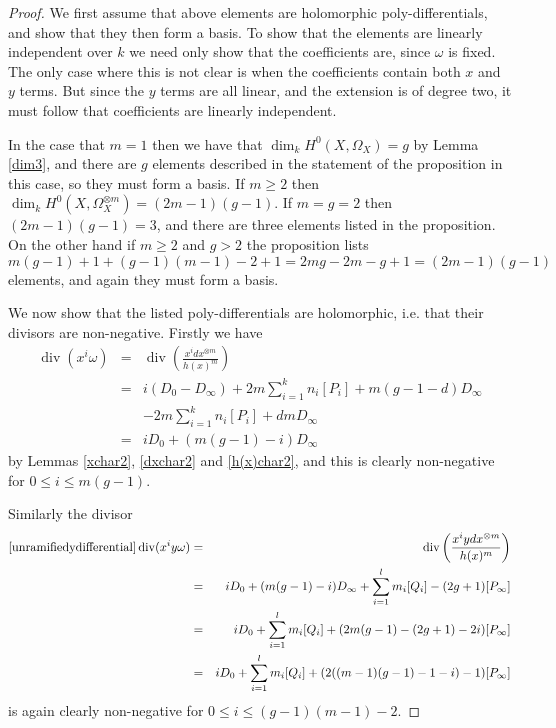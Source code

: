 \documentclass[11pt]{article} %
\theoremstyle{plain}
\theoremstyle{remark}
\DeclareMathOperator{\di}{div}
\begin{document}
\begin{proof}
 We first assume that above elements are holomorphic poly-differentials, and show that they then form a basis.
To show that the elements are linearly independent over $k$ we need only show that the coefficients are, since $\omega$ is fixed.
The only case where this is not clear is when the coefficients contain both $x$ and $y$ terms.
But since the $y$ terms are all linear, and the extension is of degree two, it must follow that coefficients are linearly independent.
 
 
 In the case that $m=1$ then we have that $\dim_k H^0(X,\Omega_X) =g$ by Lemma \ref{dim3}, and there are $g$ elements described in the statement of the proposition in this case, so they must form a basis.
 If $m \geq 2$ then $\dim_k H^0(X,\Omega_X^{\otimes m}) = (2m-1)(g-1)$.
 If $m=g=2$ then $(2m-1)(g-1) = 3$, and there are three elements listed in the proposition.
 On the other hand if $m\geq 2$ and $g > 2$ the proposition lists
 \[
  m(g-1)+1 + (g-1)(m-1)-2+1 = 2mg -2m -g +1 = (2m-1)(g-1)
 \]
 elements, and again they must form a basis.
 
 We now show that the listed poly-differentials are holomorphic, i.e. that their divisors are non-negative.
 Firstly we have
 \begin{eqnarray}\label{nonydifferentials}
  \di(x^i\omega) & = & \di \left( \frac{x^i dx^{\otimes m}}{h(x)^m} \right)\\ & = & i(D_0 - D_\infty) +2m\sum_{i=1}^k n_i[P_i] + m(g-1-d)D_\infty\\
  & & -2m\sum_{i=1}^k n_i [P_i] + dmD_\infty \\
  & = & iD_0 + (m(g-1) -i)D_\infty
 \end{eqnarray}
  by Lemmas \ref{xchar2}, \ref{dxchar2} and \ref{h(x)char2}, and this is clearly non-negative for $0\leq i \leq m(g-1)$.
  
  Similarly the divisor 
  \begin{eqnarray}\ref{unramifiedydifferential}
   \di(x^iy\omega) & = & \di \left( \frac{x^i ydx^{\otimes m}}{h(x)^m} \right)\\ & = & iD_0 + (m(g-1) -i)D_\infty + \sum_{i=1}^l m_i[Q_i] - (2g+1)[P_\infty] \\
    & = & iD_0 +  \sum_{i=1}^l m_i[Q_i] + (2m(g-1) -(2g+1) -2i)[P_\infty] \\
   & = & iD_0 +  \sum_{i=1}^l m_i[Q_i] + (2((m-1)(g-1) -1 -i)-1)[P_\infty]
  \end{eqnarray}
 is again clearly non-negative for $0 \leq i \leq (g-1)(m-1)-2$.


\end{proof}
\end{document}
